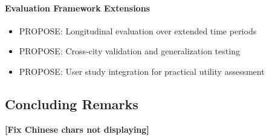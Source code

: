 \documentclass[runningheads]{llncs}
\newcommand{\matt}[1]{{\bf\color{green!50!black}[#1]}} %
\begin{document}
\paragraph{Evaluation Framework Extensions}
\begin{itemize}
\item PROPOSE: Longitudinal evaluation over extended time periods
\item PROPOSE: Cross-city validation and generalization testing
\item PROPOSE: User study integration for practical utility assessment
\end{itemize}

\subsection{Concluding Remarks}


\newpage
%
%



\matt{Fix Chinese chars not displaying}
\end{document}
